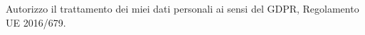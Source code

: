 
\begin{cvparagraph}
Autorizzo il trattamento dei miei dati personali ai sensi del GDPR, Regolamento UE 2016/679.
\end{cvparagraph}
